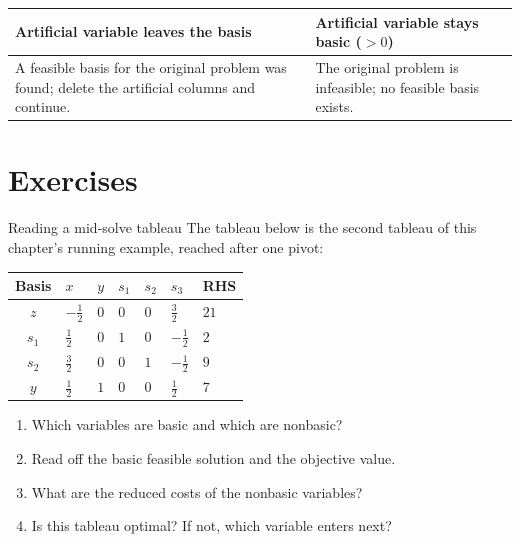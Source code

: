 \begin{center}
\renewcommand{\arraystretch}{1.3}
\begin{tabular}{@{}p{}p{}@{}}
\toprule
\textbf{Artificial variable leaves the basis} & \textbf{Artificial variable stays basic ($>0$)}\\
\midrule
A feasible basis for the original problem was found; delete the artificial columns and continue. & The original problem is infeasible; no feasible basis exists.\\
\bottomrule
\end{tabular}
\par{}\label{tab:simplex-tableau-tab01}%

\end{center}

\section{Exercises}


\begin{ex}{Reading a mid-solve tableau}{}
\label{ex:tableau-read-mid}
 The tableau below is the second tableau of this chapter's running example, reached after one pivot:
\begin{center}
\renewcommand{\arraystretch}{1.3}
\begin{tabular}{c|ZZZZZ|Z}
\toprule
Basis & $x$ & $y$ & $s_1$ & $s_2$ & $s_3$ & RHS\\
\midrule
$z$   & $-\tfrac12$ & $0$ & $0$ & $0$ & $\tfrac32$ & $21$\\
\midrule
$s_1$ & $\tfrac12$ & $0$ & $1$ & $0$ & $-\tfrac12$ & $2$\\
$s_2$ & $\tfrac32$ & $0$ & $0$ & $1$ & $-\tfrac12$ & $9$\\
$y$   & $\tfrac12$ & $1$ & $0$ & $0$ & $\tfrac12$ & $7$\\
\bottomrule
\end{tabular}
\end{center}
\begin{enumerate}
    \item Which variables are basic and which are nonbasic?
    \item Read off the basic feasible solution and the objective value.
    \item What are the reduced costs of the nonbasic variables?
    \item Is this tableau optimal?  If not, which variable enters next?
\end{enumerate}
\end{ex}

